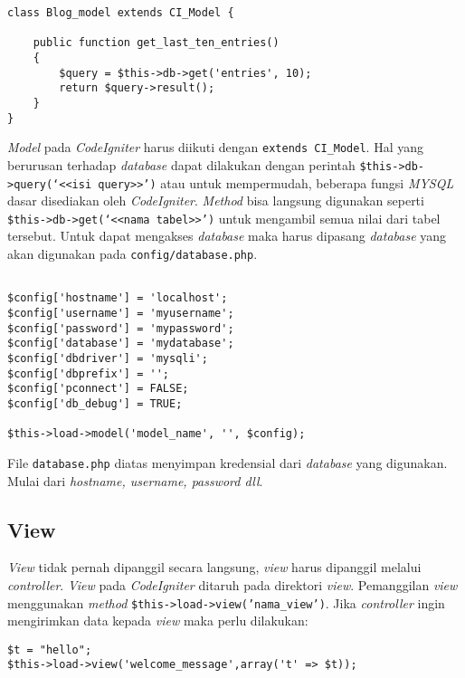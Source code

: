 \begin{lstlisting}
class Blog_model extends CI_Model {
	
	public function get_last_ten_entries()
	{
		$query = $this->db->get('entries', 10);
		return $query->result();
	}
}
\end{lstlisting}

\textit{Model} pada \textit{CodeIgniter} harus diikuti dengan \texttt{extends CI\_Model}. Hal yang berurusan terhadap \textit{database} dapat dilakukan dengan perintah \texttt{\$this->db->query(\lq<<isi query>>\rq)} atau untuk mempermudah, beberapa fungsi \textit{MYSQL} dasar disediakan oleh \textit{CodeIgniter}.\textit{ Method} bisa langsung digunakan seperti \texttt{\$this->db->get(\lq<<nama tabel>>\rq)}
untuk mengambil semua nilai dari tabel tersebut. Untuk dapat mengakses \textit{database} maka harus dipasang \textit{database} yang akan digunakan pada \texttt{config/database.php}.

\begin{lstlisting}
		
$config['hostname'] = 'localhost';
$config['username'] = 'myusername';
$config['password'] = 'mypassword';
$config['database'] = 'mydatabase';
$config['dbdriver'] = 'mysqli';
$config['dbprefix'] = '';
$config['pconnect'] = FALSE;
$config['db_debug'] = TRUE;

$this->load->model('model_name', '', $config);
\end{lstlisting}

File \texttt{database.php} diatas menyimpan kredensial dari \textit{database} yang digunakan. Mulai dari \textit{hostname, username, password dll}.

\subsection{View}


\textit{View} tidak pernah dipanggil secara langsung, \textit{view} harus dipanggil melalui \textit{controller}\cite{codeigniter3}.
\textit{View} pada \textit{CodeIgniter} ditaruh pada direktori \textit{view}. Pemanggilan \textit{view} menggunakan \textit{method} \texttt{\$this->load->view('nama\_view')}. Jika \textit{controller} ingin mengirimkan data kepada \textit{view} maka perlu dilakukan: 

\begin{lstlisting}
$t = "hello";
$this->load->view('welcome_message',array('t' => $t));
\end{lstlisting}

